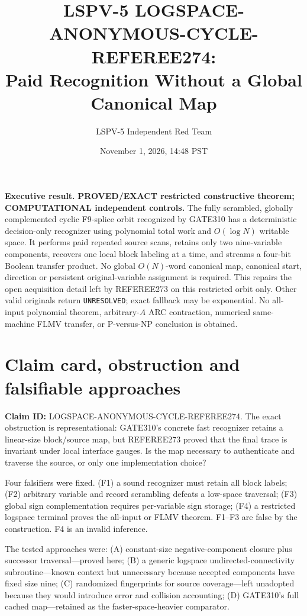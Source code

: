 \documentclass[11pt]{article}
\title{LSPV-5 LOGSPACE-ANONYMOUS-CYCLE-REFEREE274:\\Paid Recognition Without a Global Canonical Map}
\author{LSPV-5 Independent Red Team}
\date{November 1, 2026, 14:48 PST}
\begin{document}
\maketitle

\noindent\textbf{Executive result.}
\textbf{PROVED/EXACT restricted constructive theorem; COMPUTATIONAL independent controls.}
The fully scrambled, globally complemented cyclic F9-splice orbit recognized by
GATE310 has a deterministic decision-only recognizer using polynomial total work
and $O(\log N)$ writable space.  It performs paid repeated source scans, retains
only two nine-variable components, recovers one local block labeling at a time,
and streams a four-bit Boolean transfer product.  No global $O(N)$-word canonical
map, canonical start, direction or persistent original-variable assignment is
required.  This repairs the open acquisition detail left by REFEREE273 on this
restricted orbit only.  Other valid originals return \texttt{UNRESOLVED}; exact
fallback may be exponential.  No all-input polynomial theorem, arbitrary-$A$
ARC contraction, numerical same-machine FLMV transfer, or P-versus-NP conclusion
is obtained.

\section{Claim card, obstruction and falsifiable approaches}
\textbf{Claim ID:} LOGSPACE-ANONYMOUS-CYCLE-REFEREE274.
The exact obstruction is representational: GATE310's concrete fast recognizer
retains a linear-size block/source map, but REFEREE273 proved that the final trace
is invariant under local interface gauges.  Is the map necessary to authenticate
and traverse the source, or only one implementation choice?

Four falsifiers were fixed.  (F1) a sound recognizer must retain all block labels;
(F2) arbitrary variable and record scrambling defeats a low-space traversal;
(F3) global sign complementation requires per-variable sign storage; (F4) a
restricted logspace terminal proves the all-input or FLMV theorem.  F1--F3 are
false by the construction.  F4 is an invalid inference.

The tested approaches were: (A) constant-size negative-component closure plus
successor traversal---proved here; (B) a generic logspace undirected-connectivity
subroutine---known context but unnecessary because accepted components have fixed
size nine; (C) randomized fingerprints for source coverage---left unadopted because
they would introduce error and collision accounting; (D) GATE310's full cached
map---retained as the faster-space-heavier comparator.
\end{document}
